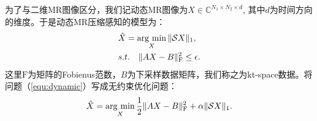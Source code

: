 为了与二维MR图像区分，我们记动态MR图像为$X\in \mathbb{C}^{N_1\times N_2\times d}$, 其中$d$为时间方向的维度。于是动态MR压缩感知的模型为：
\begin{equation}
\begin{aligned}
	&\hat{X}=\argmin_X \|\mathcal{S}X\|_1,\\
	&s.t.\quad \|AX-B\|_\mathrm{F}^2 \leq \epsilon.
\end{aligned}
\label{equ:dynamic}
\end{equation}
这里$\mathrm{F}$为矩阵的Fobienus范数，$B$为下采样数据矩阵，我们称之为kt-space数据。将问题（\ref{equ:dynamic}）写成无约束优化问题：
\begin{equation}
	\hat{X}=\argmin_X \frac{1}{2}\|AX-B\|_\mathrm{F}^2+\alpha\|\mathcal{S}X\|_1.
\label{equ:dunconstraint}
\end{equation}

